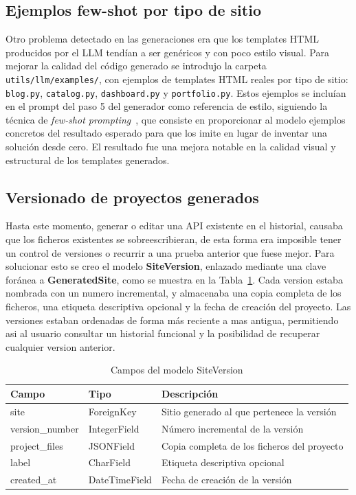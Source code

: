 \subsection{Ejemplos few-shot por tipo de sitio}
\label{subsec:ejemplos-fewshot}

Otro problema detectado en las generaciones era que los templates HTML producidos por el LLM tendían a ser genéricos y con poco estilo visual. Para mejorar la calidad del código generado se introdujo la carpeta \texttt{utils/llm/examples/}, con ejemplos de templates HTML reales por tipo de sitio: \texttt{blog.py}, \texttt{catalog.py}, \texttt{dashboard.py} y \texttt{portfolio.py}. Estos ejemplos se incluían en el prompt del paso 5 del generador como referencia de estilo, siguiendo la técnica de \emph{few-shot prompting}~\cite{openai_prompt_engineering}, que consiste en proporcionar al modelo ejemplos concretos del resultado esperado para que los imite en lugar de inventar una solución desde cero. El resultado fue una mejora notable en la calidad visual y estructural de los templates generados.


\subsection{Versionado de proyectos generados}
\label{subsec:versionado-paginas}

Hasta este momento, generar o editar una API existente en el historial, causaba que los ficheros existentes se sobreescribieran, de esta forma era imposible tener un control de versiones o recurrir a una prueba anterior que fuese mejor. Para solucionar esto se creo el modelo \textbf{SiteVersion}, enlazado mediante una clave foránea a \textbf{GeneratedSite}, como se muestra en la Tabla~\ref{tab:modelo-siteversion}. Cada version estaba nombrada con un numero incremental, y almacenaba una copia completa de los ficheros, una etiqueta descriptiva opcional y la fecha de creación del proyecto. Las versiones estaban ordenadas de forma más reciente a mas antigua, permitiendo asi al usuario consultar un historial funcional y la posibilidad de recuperar cualquier version anterior.

\begin{table}[H]
    \centering
    \begin{tabular}{|l|l|p{8cm}|}
        \hline
        \textbf{Campo} & \textbf{Tipo} & \textbf{Descripción} \\
        \hline
        site & ForeignKey & Sitio generado al que pertenece la versión \\
        \hline
        version\_number & IntegerField & Número incremental de la versión \\
        \hline
        project\_files & JSONField & Copia completa de los ficheros del proyecto \\
        \hline
        label & CharField & Etiqueta descriptiva opcional \\
        \hline
        created\_at & DateTimeField & Fecha de creación de la versión \\
        \hline
    \end{tabular}
    \caption{Campos del modelo SiteVersion}
    \label{tab:modelo-siteversion}
\end{table}


